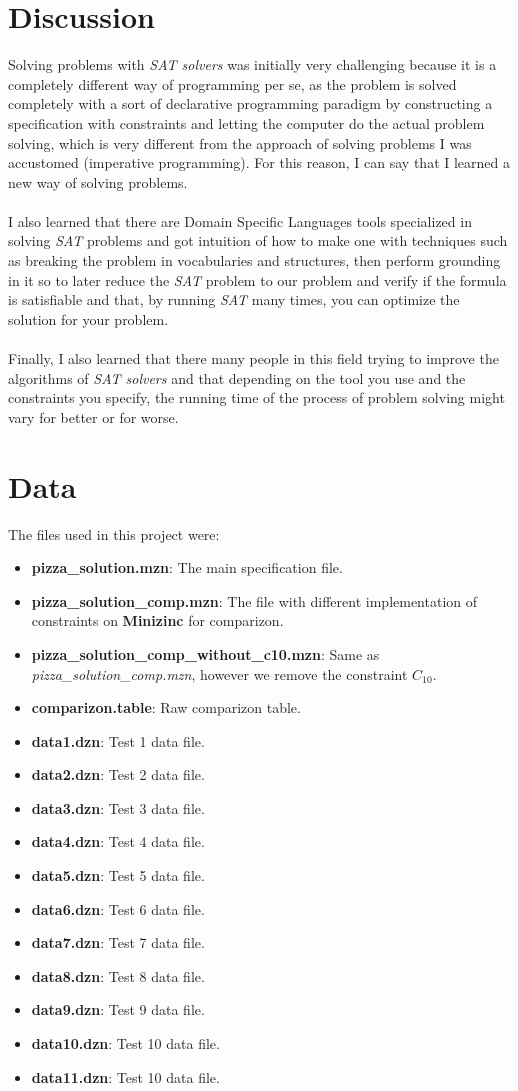 \documentclass[conference]{IEEEtran}
\newcommand\tab[1][0.3cm]{\hspace*{#1}}
\begin{document}
\section{Discussion}
Solving problems with \textit{SAT solvers} was initially very challenging because it is a completely different way of programming per se, as the problem is solved completely with a sort of declarative programming paradigm by constructing a specification with constraints and letting the computer do the actual problem solving, which is very different from the approach of solving problems I was accustomed (imperative programming). For this reason, I can say that I learned a new way of solving problems.
\\
\\
\tab I also learned that there are Domain Specific Languages tools specialized in solving \textit{SAT} problems and got intuition of how to make one with techniques such as breaking the problem in vocabularies and structures, then perform grounding in it so to later reduce the \textit{SAT} problem to our problem and verify if the formula is satisfiable and that, by running \textit{SAT} many times, you can optimize the solution for your problem.
\\
\\
\tab Finally, I also learned that there many people in this field trying to improve the algorithms of \textit{SAT solvers} and that depending on the tool you use and the constraints you specify, the running time of the process of problem solving might vary for better or for worse.
\section{Data}
The files used in this project were:
\begin{itemize}
\item \textbf{pizza\_solution.mzn}: The main specification file.
\item \textbf{pizza\_solution\_comp.mzn}: The file with different implementation of constraints on \textbf{Minizinc} for comparizon.
\item \textbf{pizza\_solution\_comp\_without\_c10.mzn}: Same as \textit{pizza\_solution\_comp.mzn}, however we remove the constraint $C_{10}$.
\item \textbf{comparizon.table}: Raw comparizon table.
\item \textbf{data1.dzn}: Test 1 data file.
\item \textbf{data2.dzn}: Test 2 data file.
\item \textbf{data3.dzn}: Test 3 data file.
\item \textbf{data4.dzn}: Test 4 data file.
\item \textbf{data5.dzn}: Test 5 data file.
\item \textbf{data6.dzn}: Test 6 data file.
\item \textbf{data7.dzn}: Test 7 data file.
\item \textbf{data8.dzn}: Test 8 data file.
\item \textbf{data9.dzn}: Test 9 data file.
\item \textbf{data10.dzn}: Test 10 data file.
\item \textbf{data11.dzn}: Test 10 data file.
\end{itemize}
\end{document}
